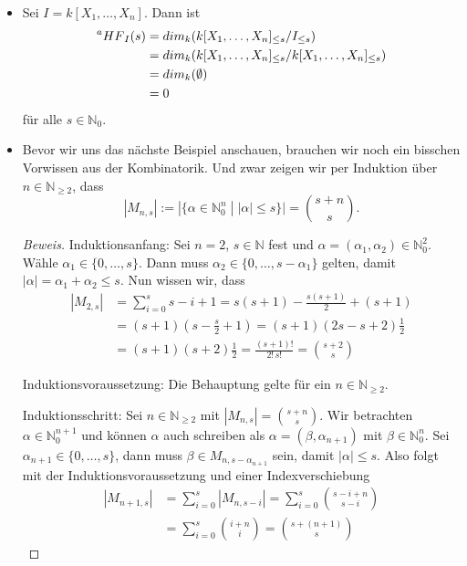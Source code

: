 \documentclass{article}
\newcommand*{\R}{k[X_{1},\ldots,X_{n}]}
\begin{document}
	\begin{itemize}
	\item Sei \(I = \R\). Dann ist
		\begin{align*}
			\prescript{a}{}{HF}_{I}(s) &= dim_{k}(\R_{\leq s}/I_{\leq s}) \\
			&= dim_{k}(\R_{\leq s}/\R_{\leq s}) \\
			&= dim_{k}(\emptyset) \\
			&= 0
		\end{align*}
	 für alle \(s \in \mathbb{N}_{0}\).  
	\item Bevor wir uns das nächste Beispiel anschauen, brauchen wir noch ein bisschen Vorwissen
	aus der Kombinatorik. Und zwar zeigen wir per Induktion über \(n \in \mathbb{N}_{\geq 2}\),
	dass
	\begin{displaymath}
		|M_{n,s}| := |\{\alpha \in \mathbb{N}^{n}_{0}\; |\; |\alpha| \leq s \}| = \binom{s + n}{s}.
	\end{displaymath}
	
	\begin{proof}[Beweis]
	Induktionsanfang: Sei \(n = 2\), \(s \in \mathbb{N}\) fest und \(\alpha = (\alpha_{1}, 
	\alpha_{2}) \in \mathbb{N}^{2}_{0}\). Wähle \(\alpha_{1} \in \{0, \ldots, s\}\). Dann muss
	\(\alpha_{2} \in \{0, \ldots, s - \alpha_{1}\}\) gelten, damit \(|\alpha| = \alpha_{1} +
	\alpha_{2} \leq s\). Nun wissen wir, dass
	\begin{align*}
		|M_{2,s}| &= \sum_{i=0}^{s} s-i+1 = s(s+1) - \frac{s(s+1)}{2} + (s+1) \\
		&= (s+1)(s - \frac{s}{2} + 1) = (s+1)(2s - s +2)\frac{1}{2} \\
		&= (s+1)(s+2)\frac{1}{2} = \frac{(s+1)!}{2!\,s!} = \binom{s+2}{s}
	\end{align*}
	
	Induktionsvoraussetzung: Die Behauptung gelte für ein \(n \in \mathbb{N}_{\geq 2}\).

	Induktionsschritt: Sei \(n \in \mathbb{N}_{\geq 2}\) mit \(|M_{n,s}| = \binom{s + n}{s}\). Wir
	betrachten \(\alpha \in \mathbb{N}^{n+1}_{0}\) und können \(\alpha\) auch schreiben als
	\(\alpha = (\beta, \alpha_{n+1})\) mit \(\beta \in \mathbb{N}^{n}_{0}\). Sei \(\alpha_{n+1}
	\in \{0, \ldots, s\}\), dann muss \(\beta \in M_{n,s-\alpha_{n+1}}\) sein, damit
	\(|\alpha| \leq s\). Also folgt mit der Induktionsvoraussetzung und einer Indexverschiebung
	\begin{align*}
		|M_{n+1,s}| &= \sum_{i=0}^{s} |M_{n,s-i}| = \sum_{i=0}^{s} \binom{s-i+n}{s-i} \\
		&= \sum_{i=0}^{s} \binom{i+n}{i} = \binom{s+(n+1)}{s}
	\end{align*}


\end{proof}
\end{itemize}
\end{document}
